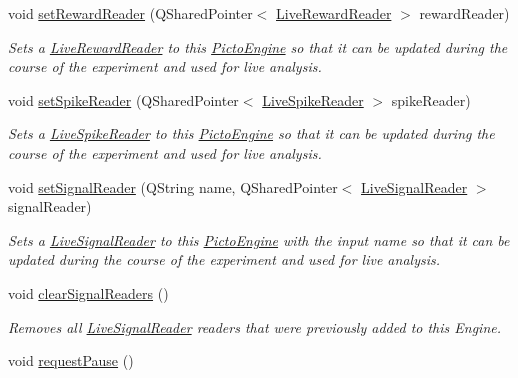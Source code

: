 \begin{DoxyCompactItemize}
void \hyperlink{class_picto_1_1_engine_1_1_picto_engine_a28f8ee68716861d64f9c2d2fde90367c}{set\-Reward\-Reader} (Q\-Shared\-Pointer$<$ \hyperlink{class_picto_1_1_live_reward_reader}{Live\-Reward\-Reader} $>$ reward\-Reader)
\begin{DoxyCompactList}\small\item\em Sets a \hyperlink{class_picto_1_1_live_reward_reader}{Live\-Reward\-Reader} to this \hyperlink{class_picto_1_1_engine_1_1_picto_engine}{Picto\-Engine} so that it can be updated during the course of the experiment and used for live analysis. \end{DoxyCompactList}\item 
void \hyperlink{class_picto_1_1_engine_1_1_picto_engine_a6f2c050412a2a56f96edb295276cf4ef}{set\-Spike\-Reader} (Q\-Shared\-Pointer$<$ \hyperlink{class_picto_1_1_live_spike_reader}{Live\-Spike\-Reader} $>$ spike\-Reader)
\begin{DoxyCompactList}\small\item\em Sets a \hyperlink{class_picto_1_1_live_spike_reader}{Live\-Spike\-Reader} to this \hyperlink{class_picto_1_1_engine_1_1_picto_engine}{Picto\-Engine} so that it can be updated during the course of the experiment and used for live analysis. \end{DoxyCompactList}\item 
void \hyperlink{class_picto_1_1_engine_1_1_picto_engine_a8bddd8ddee505f60222e2bed974f032b}{set\-Signal\-Reader} (Q\-String name, Q\-Shared\-Pointer$<$ \hyperlink{class_picto_1_1_live_signal_reader}{Live\-Signal\-Reader} $>$ signal\-Reader)
\begin{DoxyCompactList}\small\item\em Sets a \hyperlink{class_picto_1_1_live_signal_reader}{Live\-Signal\-Reader} to this \hyperlink{class_picto_1_1_engine_1_1_picto_engine}{Picto\-Engine} with the input name so that it can be updated during the course of the experiment and used for live analysis. \end{DoxyCompactList}\item 
void \hyperlink{class_picto_1_1_engine_1_1_picto_engine_a8dd3b23b45813556253c967d287de88e}{clear\-Signal\-Readers} ()
\begin{DoxyCompactList}\small\item\em Removes all \hyperlink{class_picto_1_1_live_signal_reader}{Live\-Signal\-Reader} readers that were previously added to this Engine. \end{DoxyCompactList}\item 
void \hyperlink{class_picto_1_1_engine_1_1_picto_engine_a16a57e8c44cff2eca5a50752b3c2b2e0}{request\-Pause} ()

\end{DoxyCompactItemize}
